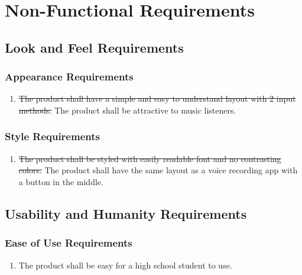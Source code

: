 \documentclass[]{article}
\newcounter{saveenum}
\newcommand{\pauseEnum}{\setcounter{saveenum}{\value{enumi}}}
\newcommand{\resumeEnum}{\setcounter{enumi}{\value{saveenum}}}
\begin{document}
\section{Non-Functional Requirements}
\label{sec:non-functional_requirements}
\subsection{Look and Feel Requirements}
\label{sub:look_and_feel_requirements}

\subsubsection{Appearance Requirements}
\label{ssub:appearance_requirements}
\begin{enumerate}[{LF}1. ]
	\item \sout{The product shall have a simple and easy to understand layout with 2 input methods.}
	The product shall be attractive to music listeners.
	\pauseEnum
\end{enumerate}

\subsubsection{Style Requirements}
\label{ssub:style_requirements}
\begin{enumerate}[{LF}1.]
	\resumeEnum
	\item \sout{The product shall be styled with easily readable font and no contrasting colors.}
	The product shall have the same layout as a voice recording app with a button in the middle.
\end{enumerate}


\subsection{Usability and Humanity Requirements}
\label{sub:usability_and_humanity_requirements}

\subsubsection{Ease of Use Requirements}
\label{ssub:ease_of_use_requirements}
\begin{enumerate}[{UH}1. ]
	\item The product shall be easy for a high school student to use.
	\pauseEnum
\end{enumerate}
\end{document}
